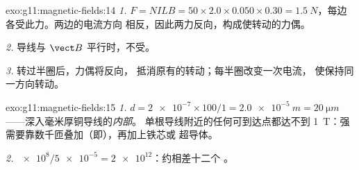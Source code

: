 \begin{solution}{exo:g11:magnetic-fields:14}
\emph{1.} $F = NILB = 50 \times 2.0 \times 0.050 \times 0.30 =
\qty{1.5}{N}$，每边各受此力。两边的电流方向
相反，因此两力反向，构成使转动的力偶。

\emph{2.} 导线与 $\vect B$ 平行时，不受。

\emph{3.} 转过半圈后，力偶将反向，
抵消原有的转动；每半圈改变一次电流，
使保持同一方向转动。
\end{solution}

\begin{solution}{exo:g11:magnetic-fields:15}
\emph{1.} $d = \num{2e-7} \times 100 / 1 = \qty{2.0e-5}{m} =
\qty{20}{\micro m}$——深入毫米厚铜导线的\emph{内部}。
单根导线附近的任何可到达点都达不到 \qty{1}{T}：强
需要靠数千匝叠加（即），再加上铁芯或
超导体。

\emph{2.} $\num{e8} / \num{5e-5} = \num{2e12}$：约相差十二个
。
\end{solution}

